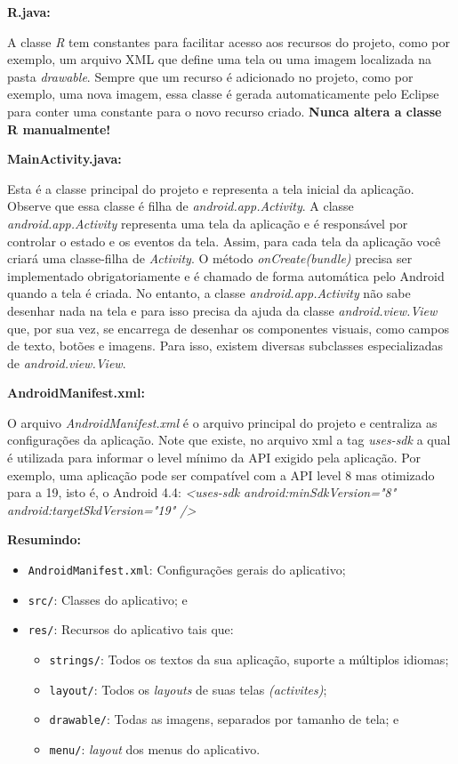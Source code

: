 \documentclass[a4paper,12pt,brazil,oneside]{book}
\begin{document}
\textbf{R.java:}

A classe \emph{R} tem constantes para facilitar acesso aos recursos do projeto, como por exemplo, um arquivo XML que define uma tela ou uma imagem localizada na pasta \emph{drawable}.
Sempre que um recurso é adicionado no projeto, como por exemplo, uma nova imagem, essa classe é gerada automaticamente pelo Eclipse para conter uma constante para o novo recurso criado. \textbf{Nunca altera a classe R manualmente!} 

\textbf{MainActivity.java:}

Esta é a classe principal do projeto e representa a tela inicial da aplicação. Observe que essa classe é filha de \emph{android.app.Activity}.
A classe \emph{android.app.Activity} representa uma tela da aplicação e é responsável por controlar o estado e os eventos da tela. Assim, para cada tela da aplicação você criará uma classe-filha de \emph{Activity}. O método \emph{onCreate(bundle)} precisa ser implementado obrigatoriamente e é chamado de forma automática pelo Android quando a tela é criada. No entanto, a classe \emph{android.app.Activity} não sabe desenhar nada na tela e para isso precisa da ajuda da classe \emph{android.view.View} que, por sua vez, se encarrega de desenhar os componentes visuais, como campos de texto, botões e imagens. Para isso, existem diversas subclasses especializadas de \emph{android.view.View}.

\textbf{AndroidManifest.xml:}

O arquivo \emph{AndroidManifest.xml} é o arquivo principal do projeto e centraliza as configurações da aplicação. Note que existe, no arquivo xml a tag \emph{uses-sdk} a qual é utilizada para informar o level mínimo da API exigido pela aplicação. Por exemplo, uma aplicação pode ser compatível com a API level 8 mas otimizado para a 19, isto é, o Android 4.4: \emph{<uses-sdk android:minSdkVersion="8"   android:targetSkdVersion="19"  />}



\textbf{Resumindo:}
\begin{itemize}
\item \texttt{AndroidManifest.xml}: Configurações gerais do aplicativo;
\item \texttt{src/}: Classes do aplicativo; e
\item \texttt{res/}: Recursos do aplicativo tais que:
	\begin{itemize}
		\item \texttt{strings/}: Todos os textos da sua aplicação, suporte a múltiplos idiomas;	
		\item \texttt{layout/}: Todos os \emph{layouts} de suas telas \emph{(activites)};
		\item \texttt{drawable/}: Todas as imagens, separados por tamanho de tela; e
		\item \texttt{menu/}: \emph{layout} dos menus do aplicativo.
	\end{itemize}
\end{itemize}
\end{document}
